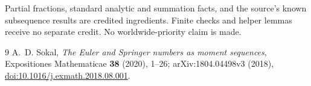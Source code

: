 \documentclass[11pt]{article}
\begin{document}
Partial fractions, standard analytic and summation facts, and the source's known subsequence results are credited ingredients. Finite checks and helper lemmas receive no separate credit. No worldwide-priority claim is made.

\begin{thebibliography}{9}
 A.~D. Sokal, \emph{The Euler and Springer numbers as moment sequences}, Expositiones Mathematicae \textbf{38} (2020), 1--26; arXiv:1804.04498v3 (2018), \href{https://doi.org/10.1016/j.exmath.2018.08.001}{doi:10.1016/j.exmath.2018.08.001}.
\end{thebibliography}
\end{document}
